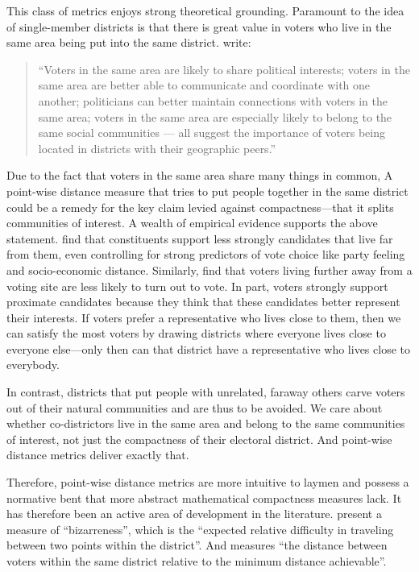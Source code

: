 \documentclass[]{article}
\begin{document}
This class of metrics enjoys strong theoretical grounding. Paramount to
the idea of single-member districts is that there is great value in
voters who live in the same area being put into the same district.
\cite{er2019} write:

\begin{quote}
``Voters in the same area are likely to share political interests;
voters in the same area are better able to communicate and coordinate
with one another; politicians can better maintain connections with
voters in the same area; voters in the same area are especially likely
to belong to the same social communities --- all suggest the importance
of voters being located in districts with their geographic peers.''
\end{quote}

Due to the fact that voters in the same area share many things in
common, A point-wise distance measure that tries to put people together
in the same district could be a remedy for the key claim levied against
compactness---that it splits communities of interest. A wealth of
empirical evidence supports the above statement. \cite{arzheimer2012}
find that constituents support less strongly candidates that live far
from them, even controlling for strong predictors of vote choice like
party feeling and socio-economic distance. Similarly, \cite{dyck2005}
find that voters living further away from a voting site are less likely
to turn out to vote. In part, voters strongly support proximate
candidates because they think that these candidates better represent
their interests. If voters prefer a representative who lives close to
them, then we can satisfy the most voters by drawing districts where
everyone lives close to everyone else---only then can that district have
a representative who lives close to everybody.

In contrast, districts that put people with unrelated, faraway others
carve voters out of their natural communities and are thus to be
avoided. We care about whether co-districtors live in the same area and
belong to the same communities of interest, not just the compactness of
their electoral district. And point-wise distance metrics deliver
exactly that.

Therefore, point-wise distance metrics are more intuitive to laymen and
possess a normative bent that more abstract mathematical compactness
measures lack. It has therefore been an active area of development in
the literature. \cite{cm2010} present a measure of ``bizarreness'',
which is the ``expected relative difficulty in traveling between two
points within the district''. And \cite{fh2011} measures ``the distance
between voters within the same district relative to the minimum distance
achievable''.
\end{document}
